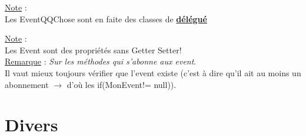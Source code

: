 \documentclass[a4paper,12pt,twoside]{article}
\newcommand{\urlcolor}{magenta}  %
\newcommand{\keycolor}{purple} %
\newcommand{\incode}[1]{{\footnotesize\ttfamily #1}} %
\newcommand{\rem}[2]{\noindent\underline{Remarque} : \textit{#1}.\\ \indent #2}
\newcommand{\note}[1]{\noindent\underline{Note} : \\ \indent #1}
\newcommand{\keyref}[2]{\hypersetup{urlcolor=\keycolor} \href{#1}{\textbf{#2}}\hypersetup{urlcolor=\urlcolor}}
\begin{document}
\note{Les EventQQChose sont en faite des classes de \keyref{https://docs.microsoft.com/en-us/dotnet/csharp/programming-guide/delegates/}{délégué}}

\note{Les \incode{Event} sont des propriétés sans Getter Setter!}\\

\rem{Sur les méthodes qui s'abonne aux event}{Il vaut mieux toujours vérifier que l'event existe (c'est à dire qu'il ait au moins un abonnement $\to$ d'où les \incode{if(MonEvent!= null)}).}

\section{Divers}



\end{document}
